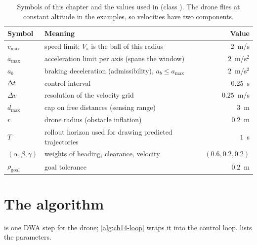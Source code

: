\begin{table}[tb]
  \centering\small
  \caption{Symbols of this chapter and the values used in 
  (class ). The drone flies at constant altitude in the
  examples, so velocities have two components.}
  \label{tab:ch14-parameters}
  \begin{tabular}{@{}llr@{}}
  \toprule
  Symbol & Meaning & Value\\
  \midrule
  $v_{\max}$ & speed limit; $V_s$ is the ball of this radius & $2$~m/s\\
  $a_{\max}$ & acceleration limit per axis (spans the window) & $2$~m/s$^2$\\
  $a_b$ & braking deceleration (admissibility), $a_b \le a_{\max}$ & $2$~m/s$^2$\\
  $\Delta t$ & control interval & $0.25$~s\\
  $\Delta v$ & resolution of the velocity grid & $0.25$~m/s\\
  $d_{\max}$ & cap on free distances (sensing range) & $3$~m\\
  $r$ & drone radius (obstacle inflation) & $0.2$~m\\
  $T$ & rollout horizon used for drawing predicted trajectories & $1$~s\\
  $(\alpha, \beta, \gamma)$ & weights of heading, clearance, velocity & $(0.6, 0.2, 0.2)$\\
  $\rho_{\mathrm{goal}}$ & goal tolerance & $0.2$~m\\
  \bottomrule
  \end{tabular}
\end{table}

\section{The algorithm}
\label{sec:ch14-algorithm}

 is one DWA step for the drone; \cref{alg:ch14-loop}
wraps it into the control loop.  lists the
parameters.

